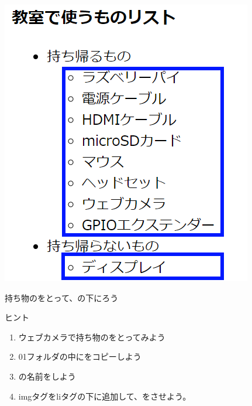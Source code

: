 \documentclass[a4paper,12pt]{jarticle}
\begin{document}
\begin{minipage}{0.45\linewidth}
  \includegraphics[width=\linewidth]{textbook-img1044.png}
\end{minipage}

\bigskip
\flushleft

\theQuestion\label{Q:hasAnswer04-11}

持ち物のをとって、の下にろう

ヒント

\begin{enumerate}
  \item
        ウェブカメラで持ち物のをとってみよう
  \item
        01フォルダの中にをコピーしよう
  \item {}の名前をしよう
  \item
        imgタグをliタグの下に追加して、をさせよう。
\end{enumerate}

\bigskip


\clearpage
\end{document}
